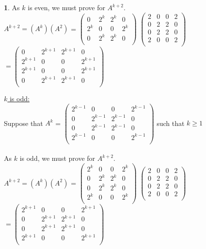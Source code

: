 \documentclass[12pt,a4paper]{article}
\theoremstyle{definition}
\newtheorem{problem}{}
\begin{document}
\begin{problem}
As $k$ is even, we must prove for $A^{k + 2}$. \\

$A^{k + 2} = (A^k)(A^2)$ = 
$\begin{pmatrix}
    0&2^k&2^k&0\\
    2^k&0&0&2^k\\
    0&2^k&2^k&0\\
\end{pmatrix}$ 
$\begin{pmatrix}
    2&0&0&2\\
    0&2&2&0\\
    0&2&2&0\\
    2&0&0&2\\
\end{pmatrix}$ 
$= \begin{pmatrix}
    0&2^{k + 1}&2^{k + 1}&0\\
    2^{k + 1}&0&0&2^{k + 1}\\
    2^{k + 1}&0&0&2^{k + 1}\\
    0&2^{k + 1}&2^{k + 1}&0\\
\end{pmatrix}$ 

\underline{$k$ is odd:} \\
Suppose that $A^k$ = $\begin{pmatrix}
    2^{k - 1}&0&0&2^{k - 1}\\
    0&2^{k - 1}&2^{k - 1}&0\\
    0&2^{k - 1}&2^{k - 1}&0\\
    2^{k - 1}&0&0&2^{k - 1}\\
\end{pmatrix}$  such that $k \geq 1$ \\\\

As $k$ is odd, we must prove for $A^{k + 2}$. \\

$A^{k + 2} = (A^k)(A^2)$ = 
$\begin{pmatrix}
    2^k&0&0&2^k\\
    0&2^k&2^k&0\\
    0&2^k&2^k&0\\
    2^k&0&0&2^k\\
\end{pmatrix}$ 
$\begin{pmatrix}
    2&0&0&2\\
    0&2&2&0\\
    0&2&2&0\\
    2&0&0&2\\
\end{pmatrix}$ 
$= \begin{pmatrix}
    2^{k + 1}&0&0&2^{k + 1}\\
    0&2^{k + 1}&2^{k + 1}&0\\
    0&2^{k + 1}&2^{k + 1}&0\\
    2^{k + 1}&0&0&2^{k + 1}\\
\end{pmatrix}$ 

\end{problem}
\end{document}
